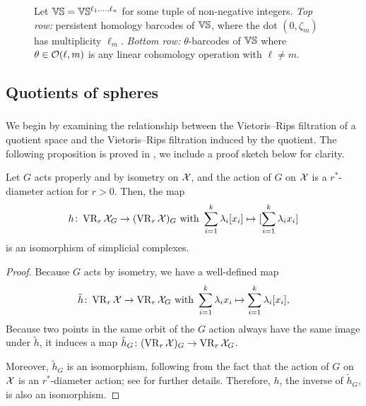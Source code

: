 \begin{figure}
	\centering
	
	\caption{Let $\mathbb{V}\mathbb{S} = \mathbb{V}\mathbb{S}^{\ell_1,\dots,\ell_n}$ for some tuple of non-negative integers.
	\emph{Top row:} persistent homology barcodes of $\mathbb{V}\mathbb{S}$, where the dot $(0,\zeta_m)$ has multiplicity $\ell_m$.
	\emph{Bottom row:} $\theta$-barcodes of $\mathbb{V}\mathbb{S}$ where $\theta \in \mathcal{O}(\ell,m)$ is any linear cohomology operation with \(\ell \neq m\).}
	\label{fig:barcodes_vs}
\end{figure}


\subsection{Quotients of spheres}

\subsubsection{}\label{subsub:h}

We begin by examining the relationship between the Vietoris--Rips filtration of a quotient space and the Vietoris--Rips filtration induced by the quotient.
The following proposition is proved in \cite[Proposition 3.5]{adams2022metric}, we include a proof sketch below for clarity.

\medskip\lemma
Let $G$ acts properly and by isometry on $\mathcal{X}$, and the action of $G$ on $\mathcal{X}$ is a $r^*$-diameter action for $r>0$. Then, the map
\[
h \colon \operatorname{VR}_r\mathcal{X}_G \to (\operatorname{VR}_r\mathcal{X})_G
\text{ with }
\sum_{i=1}^k \lambda_i [x_i] \mapsto [\sum_{i=1}^k \lambda_i x_i]
\]
is an isomorphism of simplicial complexes.

\begin{proof}
	Because $G$ acts by isometry, we have a well-defined map
	\[
	\tilde{h} \colon \operatorname{VR}_r\mathcal{X} \to \operatorname{VR}_r\mathcal{X}_G
	\text{ with }
	\sum_{i=1}^k \lambda_i x_i \mapsto \sum_{i=1}^k \lambda_i [x_i],
	\]
	Because two points in the same orbit of the $G$ action always have the same image under $\tilde{h}$, it induces a map $\tilde{h}_G \colon (\operatorname{VR}_r\mathcal{X})_G \to \operatorname{VR}_r\mathcal{X}_G$.

	Moreover, $\tilde{h}_G$ is an isomorphism, following from the fact that the action of $G$ on $\mathcal{X}$ is an $r^*$-diameter action; see \cite[Proposition 3.5]{adams2022metric} for further details.
	Therefore, $h$, the inverse of $\tilde{h}_G$, is also an isomorphism.
\end{proof}

